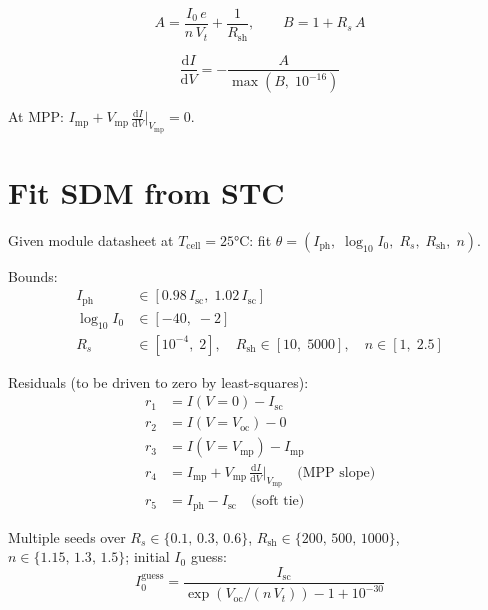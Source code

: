 \documentclass[11pt,a4paper]{article}
\begin{document}
\begin{equation}
  A = \frac{I_0\,e}{n\,V_t} + \frac{1}{R_{\mathrm{sh}}}, \qquad
  B = 1 + R_s\,A
\end{equation}

\begin{equation}
  \boxed{
  \frac{\mathrm{d}I}{\mathrm{d}V} = -\frac{A}{\max(B,\; 10^{-16})}
  }
\end{equation}

At MPP: \(I_{\mathrm{mp}} + V_{\mathrm{mp}}\,\frac{\mathrm{d}I}{\mathrm{d}V}\big|_{V_{\mathrm{mp}}} = 0\).

\section{Fit SDM from STC}

Given module datasheet at \(T_{\mathrm{cell}} = 25°\mathrm{C}\): fit \(\theta = (I_{\mathrm{ph}},\; \log_{10}I_0,\; R_s,\; R_{\mathrm{sh}},\; n)\).

Bounds:
\begin{align}
  I_{\mathrm{ph}} &\in [0.98\,I_{\mathrm{sc}},\; 1.02\,I_{\mathrm{sc}}] \\
  \log_{10}I_0 &\in [-40,\; -2] \\
  R_s &\in [10^{-4},\; 2], \quad R_{\mathrm{sh}} \in [10,\; 5000], \quad n \in [1,\; 2.5]
\end{align}

Residuals (to be driven to zero by least-squares):
\begin{align}
  r_1 &= I(V{=}0) - I_{\mathrm{sc}} \\
  r_2 &= I(V{=}V_{\mathrm{oc}}) - 0 \\
  r_3 &= I(V{=}V_{\mathrm{mp}}) - I_{\mathrm{mp}} \\
  r_4 &= I_{\mathrm{mp}} + V_{\mathrm{mp}}\,\frac{\mathrm{d}I}{\mathrm{d}V}\bigg|_{V_{\mathrm{mp}}} \quad \text{(MPP slope)} \\
  r_5 &= I_{\mathrm{ph}} - I_{\mathrm{sc}} \quad \text{(soft tie)}
\end{align}

Multiple seeds over \(R_s \in \{0.1,\,0.3,\,0.6\}\), \(R_{\mathrm{sh}} \in \{200,\,500,\,1000\}\), \(n \in \{1.15,\,1.3,\,1.5\}\); initial \(I_0\) guess:
\begin{equation}
  I_0^{\mathrm{guess}} = \frac{I_{\mathrm{sc}}}{\exp(V_{\mathrm{oc}}/(n\,V_t)) - 1 + 10^{-30}}
\end{equation}
\end{document}

